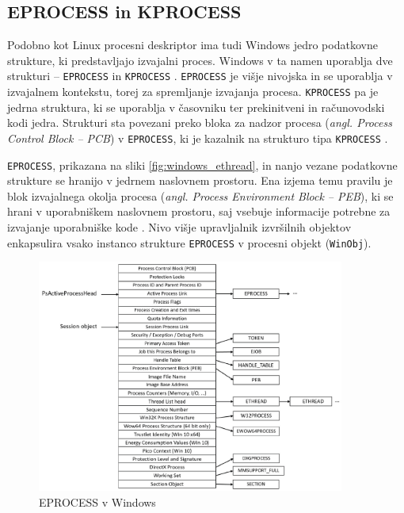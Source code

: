 \documentclass[a4paper,12pt,openright]{book}
\begin{document}
\subsection{EPROCESS in KPROCESS} \label{ssec:windows_process:eprocess}

Podobno kot Linux procesni deskriptor ima tudi Windows jedro podatkovne strukture, ki predstavljajo izvajalni proces.
Windows v ta namen uporablja dve strukturi -- \texttt{EPROCESS} in \texttt{KPROCESS} \cite{Yosifovich_Russinovich_Solomon_Ionescu_2017}.
\texttt{EPROCESS} je višje nivojska in se uporablja v izvajalnem kontekstu, torej za spremljanje izvajanja procesa.
\texttt{KPROCESS} pa je jedrna struktura, ki se uporablja v časovniku ter prekinitveni in računovodski kodi jedra.
Strukturi sta povezani preko bloka za nadzor procesa (\textit{angl. Process Control Block -- PCB}) v \texttt{EPROCESS}, ki je kazalnik na strukturo tipa \texttt{KPROCESS} \cite{Yosifovich_Russinovich_Solomon_Ionescu_2017}.

\texttt{EPROCESS}, prikazana na sliki \ref{fig:windows_ethread}, in nanjo vezane podatkovne strukture se hranijo v jedrnem naslovnem prostoru.
Ena izjema temu pravilu je blok izvajalnega okolja procesa (\textit{angl. Process Environment Block -- PEB}), ki se hrani v uporabniškem naslovnem prostoru, saj vsebuje informacije potrebne za izvajanje uporabniške kode \cite{Yosifovich_Russinovich_Solomon_Ionescu_2017}.
Nivo višje upravljalnik izvršilnih objektov enkapsulira vsako instanco strukture \texttt{EPROCESS} v procesni objekt (\texttt{WinObj}).

\begin{figure}[h!]
	\begin{center}
		\includegraphics[width=0.9\textwidth]{images/windows_eprocess.png}
	\end{center}
	\caption{EPROCESS v Windows \cite{Yosifovich_Russinovich_Solomon_Ionescu_2017}}
	\label{fig:windows_eprocess}
\end{figure}
\end{document}
